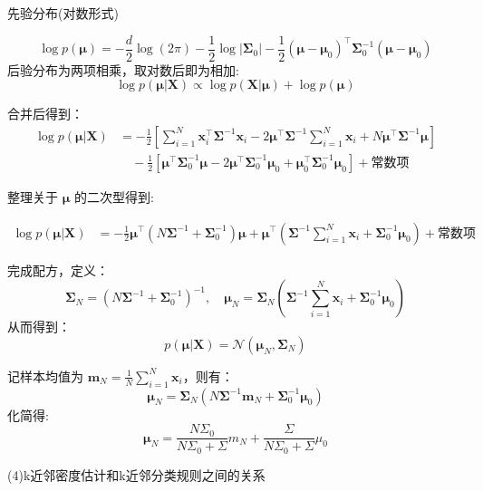 \documentclass{article}
\begin{document}
先验分布(对数形式)

\[
\log p(\boldsymbol{\mu}) 
= -\frac{d}{2} \log(2\pi) - \frac{1}{2} \log |\boldsymbol{\Sigma}_0| 
- \frac{1}{2} (\boldsymbol{\mu} - \boldsymbol{\mu}_0)^\top \boldsymbol{\Sigma}_0^{-1} (\boldsymbol{\mu} - \boldsymbol{\mu}_0)
\]
后验分布为两项相乘，取对数后即为相加:
\[
\log p(\boldsymbol{\mu}|\mathbf{X}) \propto \log p(\mathbf{X}|\boldsymbol{\mu}) + \log p(\boldsymbol{\mu})
\]

合并后得到：
\begin{align*}
\log p(\boldsymbol{\mu}|\mathbf{X}) &= 
- \frac{1}{2} \left[ 
\sum_{i=1}^N \mathbf{x}_i^\top \boldsymbol{\Sigma}^{-1} \mathbf{x}_i 
- 2 \boldsymbol{\mu}^\top \boldsymbol{\Sigma}^{-1} \sum_{i=1}^N \mathbf{x}_i 
+ N \boldsymbol{\mu}^\top \boldsymbol{\Sigma}^{-1} \boldsymbol{\mu} \right] \\
&\quad - \frac{1}{2} \left[
\boldsymbol{\mu}^\top \boldsymbol{\Sigma}_0^{-1} \boldsymbol{\mu} 
- 2 \boldsymbol{\mu}^\top \boldsymbol{\Sigma}_0^{-1} \boldsymbol{\mu}_0 
+ \boldsymbol{\mu}_0^\top \boldsymbol{\Sigma}_0^{-1} \boldsymbol{\mu}_0 \right] + \text{常数项}
\end{align*}

整理关于 \( \boldsymbol{\mu} \) 的二次型得到:

\begin{align*}
\log p(\boldsymbol{\mu}|\mathbf{X}) &= 
- \frac{1}{2} \boldsymbol{\mu}^\top (N\boldsymbol{\Sigma}^{-1} + \boldsymbol{\Sigma}_0^{-1}) \boldsymbol{\mu} 
+ \boldsymbol{\mu}^\top \left( \boldsymbol{\Sigma}^{-1} \sum_{i=1}^N \mathbf{x}_i + \boldsymbol{\Sigma}_0^{-1} \boldsymbol{\mu}_0 \right) + \text{常数项}
\end{align*}

完成配方，定义：
\[
\boldsymbol{\Sigma}_N = \left( N\boldsymbol{\Sigma}^{-1} + \boldsymbol{\Sigma}_0^{-1} \right)^{-1}, \quad
\boldsymbol{\mu}_N = \boldsymbol{\Sigma}_N \left( \boldsymbol{\Sigma}^{-1} \sum_{i=1}^N \mathbf{x}_i + \boldsymbol{\Sigma}_0^{-1} \boldsymbol{\mu}_0 \right)
\]
从而得到：
\[
p(\boldsymbol{\mu}|\mathbf{X}) = \mathcal{N}(\boldsymbol{\mu}_N, \boldsymbol{\Sigma}_N)
\]

记样本均值为 \( \mathbf{m}_N = \frac{1}{N} \sum_{i=1}^N \mathbf{x}_i \)，则有：
\[
\boldsymbol{\mu}_N = \boldsymbol{\Sigma}_N \left( N \boldsymbol{\Sigma}^{-1} \mathbf{m}_N + \boldsymbol{\Sigma}_0^{-1} \boldsymbol{\mu}_0 \right)
\]
化简得:
\[\boldsymbol{\mu}_N =\frac{N\Sigma_0}{N\Sigma_0+\Sigma}m_N+\frac{\Sigma}{N\Sigma_0+\Sigma}\mu_0\]

(4)k近邻密度估计和k近邻分类规则之间的关系
\end{document}
